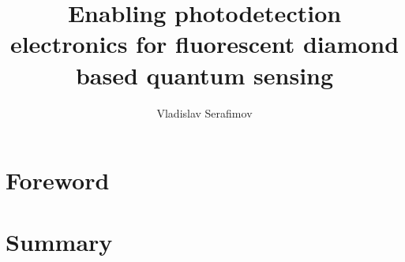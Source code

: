 \documentclass{report}
\title{Enabling photodetection electronics for 
	fluorescent diamond based quantum sensing}
\author{Vladislav Serafimov}
\begin{document}
	\maketitle
	
	
	
	\tableofcontents
	\chapter{Foreword}
	
	
	\chapter{Summary}
	
	
	
	
	
	
	
	
	
	
	
	
	
	
	
	\printglossary[type=\acronymtype]
	\printbibliography
	
\end{document}
